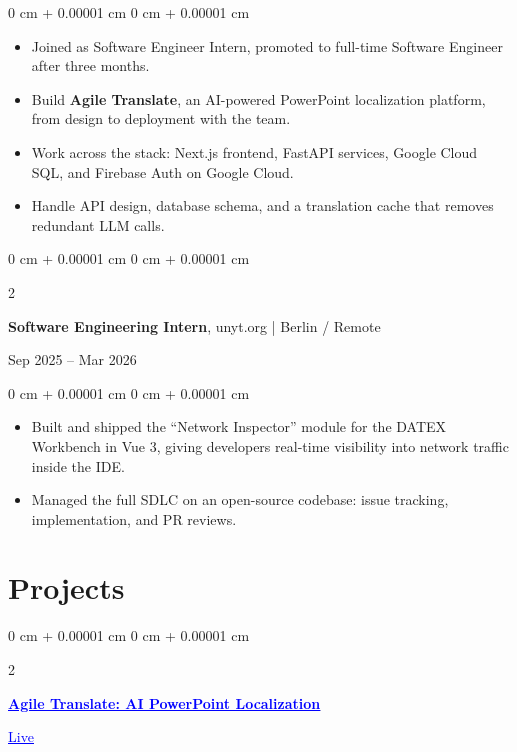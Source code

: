 \documentclass[10pt, letterpaper]{article}
\newenvironment{highlights}{
    \begin{itemize}[
        topsep=0.05 cm,
        parsep=0.05 cm,
        partopsep=0pt,
        itemsep=0pt,
        leftmargin=0 cm + 10pt
    ]
}{
    \end{itemize}
}
\newenvironment{onecolentry}{
    \begin{adjustwidth}{
        0 cm + 0.00001 cm
    }{
        0 cm + 0.00001 cm
    }
}{
    \end{adjustwidth}
}
\newenvironment{twocolentry}[2][]{
    \onecolentry
    \def\secondColumn{#2}
    \setcolumnwidth{\fill, 4.5 cm}
    \begin{paracol}{2}
}{
    \switchcolumn \raggedleft \secondColumn
    \end{paracol}
    \endonecolentry
}
\begin{document}
    \vspace{0.06 cm}
    \begin{onecolentry}
        \begin{highlights}
            \item Joined as Software Engineer Intern, promoted to full-time Software Engineer after three months.
            \item Build \textbf{Agile Translate}, an AI-powered PowerPoint localization platform, from design to deployment with the team.
            \item Work across the stack: Next.js frontend, FastAPI services, Google Cloud SQL, and Firebase Auth on Google Cloud.
            \item Handle API design, database schema, and a translation cache that removes redundant LLM calls.
        \end{highlights}
    \end{onecolentry}

    \vspace{0.08 cm}

    \begin{twocolentry}{
        Sep 2025 – Mar 2026
    }
        \textbf{Software Engineering Intern}, unyt.org | Berlin / Remote
    \end{twocolentry}

    \vspace{0.06 cm}
    \begin{onecolentry}
        \begin{highlights}
            \item Built and shipped the ``Network Inspector'' module for the DATEX Workbench in Vue 3, giving developers real-time visibility into network traffic inside the IDE.
            \item Managed the full SDLC on an open-source codebase: issue tracking, implementation, and PR reviews.
        \end{highlights}
    \end{onecolentry}

    \section{Projects}

    \begin{twocolentry}{
        2026 \hspace{0.5cm} \href{https://www.theagileworx.com/products/slideworx}{\textcolor{blue}{\underline{Live}}}
    }
        \textbf{\href{https://www.theagileworx.com/products/slideworx}{\textcolor{blue}{\underline{Agile Translate: AI PowerPoint Localization}}}}
    \end{twocolentry}
\end{document}
